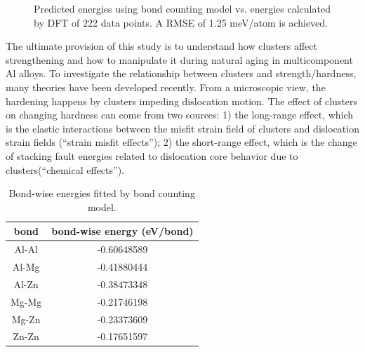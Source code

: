 \begingroup
\begin{figure}[!ht]
  \centering
\caption[Predicted energies using bond counting model vs. energies calculated by \ac{DFT}.]{Predicted energies using bond counting model vs. energies calculated by \ac{DFT} of 222 data points. A RMSE of 1.25 meV/atom is achieved.}
\label{Chap:Al/Vac:fig:bond_count}
\end{figure}
\endgroup


The ultimate provision of this study is to understand how clusters affect strengthening and how to manipulate it during natural aging in multicomponent Al alloys. To investigate the relationship between clusters and strength/hardness, many theories have been developed recently\cite{yasi2010first, starink2009thermodynamics, curtin2006predictive}. From a microscopic view, the hardening happens by clusters impeding dislocation motion. The effect of clusters on changing hardness can come from two sources: 1) the long-range effect, which is the elastic interactions between the misfit strain field of clusters and dislocation strain fields (``strain misfit effects''); 2) the short-range effect, which is the change of stacking fault energies related to dislocation core behavior due to clusters(``chemical effects'')\cite{yasi2010first}.


\begin{table}[!htbp]
\centering
\caption[Bond-wise energies fitted by bond counting model.]{Bond-wise energies fitted by bond counting model.}
\label{Chap:Al/Vac:tab:bond_count}
\begin{tabular}{cc}
\\
\hline
\hline
bond & bond-wise energy (eV/bond)\\ \hline
Al-Al & -0.60648589\\
Al-Mg & -0.41880444\\
Al-Zn & -0.38473348\\
Mg-Mg & -0.21746198\\
Mg-Zn & -0.23373609\\
Zn-Zn & -0.17651597\\
\hline
\hline
\end{tabular}
\end{table}


